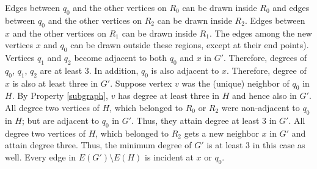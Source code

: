Edges between $q_0$ and the other vertices on $R_0$ can be drawn inside $R_0$ and edges between $q_0$ and the other vertices on $R_2$ can be drawn inside 
$R_2$. Edges between $x$ and the other vertices on $R_1$ can be drawn inside $R_1$. The edges among the new vertices $x$ and $q_0$ can be drawn outside 
these regions, except at their end points). Vertices $q_1$ and $q_2$ become adjacent to both $q_0$ and $x$ in $G'$. Therefore, degrees of 
$q_0$, $q_1$, $q_2$ are at least $3$. In addition, $q_0$ is also adjacent to $x$. Therefore, degree of $x$ is also at least three in $G'$. 
Suppose vertex $v$ was the (unique) neighbor of $q_0$ in $H$. By Property \ref{subgraph}, $v$ has degree at least three in $H$ and hence also in $G'$. 
All degree two vertices of $H$, which belonged to $R_0$ or $R_2$ were non-adjacent to $q_0$ in $H$; but are adjacent to $q_0$ in $G'$. 
Thus, they attain degree at least $3$ in $G'$. All degree two vertices of $H$, which belonged to $R_2$ gets a new neighbor $x$ in $G'$ and attain 
degree three. Thus, the minimum degree of $G'$ is at least $3$ in this case as well. Every edge in $E(G')\setminus E(H)$ is incident at $x$ or $q_0$. 

